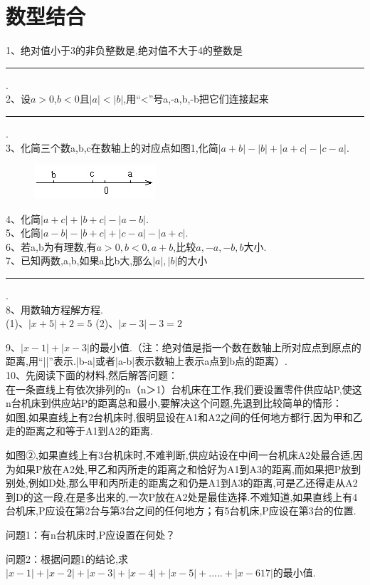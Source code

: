 \documentclass[14pt,UTF-8,a4paper,titlepage]{ctexbook}
\begin{document}
\section{数型结合}
\setlength{\parindent}{0pt} 1、绝对值小于3的非负整数是,绝对值不大于4的整数是\rule[-5pt]{1.3cm}{0.05em}.\\
2、设$a>0$,$b<0$且$|a|<|b|$,用“<”号a,-a,b,-b把它们连接起来\rule[-5pt]{1.3cm}{0.05em}.\\
3、化简三个数a,b,c在数轴上的对应点如图1,化简$|a+b|-|b|+|a+c|-|c-a|$.\\
\begin{figure}[htb]
\includegraphics[scale=1]{1.jpg}
\caption{}
\end{figure}
4、化简$|a+c|+|b+c|-|a-b|$.\\
5、化简$|a-b|-|b+c|+|c-a|-|a+c|$.\\
6、若a,b为有理数,有$a>0,b<0,a+b$,比较$a,-a,-b,b$大小.\\
7、已知两数,a,b,如果a比b大,那么$|a|,|b|$的大小\rule[-5pt]{1.3cm}{0.05em}.\\
8、用数轴方程解方程.\\
\qquad \qquad (1)、$|x+5|+2=5$ \qquad\qquad\qquad\qquad\qquad\qquad (2)、$|x-3|-3=2$\par
\vspace{5cm}
9、$|x-1|+|x-3|$的最小值.（注：绝对值是指一个数在数轴上所对应点到原点的距离,用“||”表示.|b-a|或者|a-b|表示数轴上表示a点到b点的距离）.\\
10、先阅读下面的材料,然后解答问题：\\
\hspace{16pt} 在一条直线上有依次排列的n（n＞1）台机床在工作,我们要设置零件供应站P,使这n台机床到供应站P的距离总和最小,要解决这个问题,先退到比较简单的情形：\\
\hspace{16pt}如图,如果直线上有2台机床时,很明显设在A1和A2之间的任何地方都行,因为甲和乙走的距离之和等于A1到A2的距离.\par
\hspace{16pt}如图②,如果直线上有3台机床时,不难判断,供应站设在中间一台机床A2处最合适,因为如果P放在A2处,甲乙和丙所走的距离之和恰好为A1到A3的距离,而如果把P放到别处,例如D处,那么甲和丙所走的距离之和仍是A1到A3的距离,可是乙还得走从A2到D的这一段,在是多出来的,一次P放在A2处是最佳选择.不难知道,如果直线上有4台机床,P应设在第2台与第3台之间的任何地方；有5台机床,P应设在第3台的位置.\par
问题1：有n台机床时,P应设置在何处？\par
\vspace{3cm}
问题2：根据问题1的结论,求$|x-1|+|x-2|+|x-3|+|x-4|+|x-5|+.....+|x-617|$的最小值.
\vspace{4cm}
\end{document}
